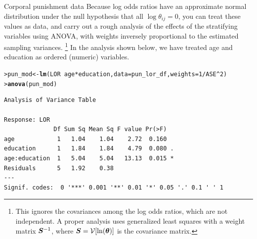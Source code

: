 \documentclass[10pt,krantz2]{krantz}\usepackage[]{graphicx}\usepackage[]{color}
\makeatletter
\newcommand{\hlnum}[1]{\textcolor[rgb]{0.686,0.059,0.569}{#1}}%
\newcommand{\hlopt}[1]{\textcolor[rgb]{0,0,0}{#1}}%
\newcommand{\hlstd}[1]{\textcolor[rgb]{0.345,0.345,0.345}{#1}}%
\newcommand{\hlkwb}[1]{\textcolor[rgb]{0.69,0.353,0.396}{#1}}%
\newcommand{\hlkwc}[1]{\textcolor[rgb]{0.333,0.667,0.333}{#1}}%
\newcommand{\hlkwd}[1]{\textcolor[rgb]{0.737,0.353,0.396}{\textbf{#1}}}%
\newenvironment{kframe}{%
 \def\at@end@of@kframe{}%
 \ifinner\ifhmode%
  \def\at@end@of@kframe{\end{minipage}}%
  \begin{minipage}{\columnwidth}%
 \fi\fi%
 \def\FrameCommand##1{\hskip\@totalleftmargin \hskip-\fboxsep
 \colorbox{shadecolor}{##1}\hskip-\fboxsep
     \hskip-\linewidth \hskip-\@totalleftmargin \hskip\columnwidth}%
 \MakeFramed {\advance\hsize-\width
   \@totalleftmargin\z@ \linewidth\hsize
   \@setminipage}}%
 {\par\unskip\endMakeFramed%
 \at@end@of@kframe}
\newenvironment{knitrout}{}{} %
\renewenvironment{knitrout}{\small\renewcommand{\baselinestretch}{.85}}{} %
\makeatother
\begin{document}
\begin{Example}[punish2]{Corporal punishment data}
Because log odds ratios have an approximate normal distribution under the null hypothesis that
all $\log \theta_{ij} =0$, you can treat these values as data, and carry out a rough analysis
of the effects of the stratifying variables using ANOVA, with weights inversely proportional to the
estimated sampling variances.%
\footnote{
This ignores the covariances among the log odds ratios, which are not independent.
A proper analysis uses generalized least squares
with a weight matrix $\bm{S}^{-1}$, where $\bm{S} = \mathcal{V} [\ln (\bm{\theta})]$ is the covariance matrix. 
}
In the analysis shown below, we have treated age and education as
ordered (numeric) variables.


\begin{knitrout}
\color{fgcolor}\begin{kframe}
\begin{alltt}
\hlstd{> }\hlstd{pun_mod} \hlkwb{<-} \hlkwd{lm}\hlstd{(LOR} \hlopt{~} \hlstd{age} \hlopt{*} \hlstd{education,} \hlkwc{data} \hlstd{= pun_lor_df,} \hlkwc{weights} \hlstd{=} \hlnum{1} \hlopt{/} \hlstd{ASE}\hlopt{^}\hlnum{2}\hlstd{)}
\hlstd{> }\hlkwd{anova}\hlstd{(pun_mod)}
\end{alltt}
\begin{verbatim}
Analysis of Variance Table

Response: LOR
              Df Sum Sq Mean Sq F value Pr(>F)  
age            1   1.04    1.04    2.72  0.160  
education      1   1.84    1.84    4.79  0.080 .
age:education  1   5.04    5.04   13.13  0.015 *
Residuals      5   1.92    0.38                 
---
Signif. codes:  0 '***' 0.001 '**' 0.01 '*' 0.05 '.' 0.1 ' ' 1
\end{verbatim}
\end{kframe}
\end{knitrout}
\end{Example}
\end{document}

